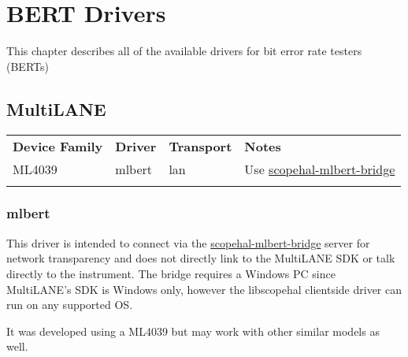 \chapter{BERT Drivers}
\label{sec:bert-drivers}

This chapter describes all of the available drivers for bit error rate testers (BERTs)

\section{MultiLANE}

\begin{tabularx}{16cm}{lllX}
\thickhline
\textbf{Device Family} & \textbf{Driver} & \textbf{Transport} & \textbf{Notes} \\
\thickhline
ML4039 & mlbert & lan & Use \href{https://github.com/ngscopeclient/scopehal-mlbert-bridge}{scopehal-mlbert-bridge} \\
\thickhline
\end{tabularx}

\subsection{mlbert}

This driver is intended to connect via the
\href{https://github.com/ngscopeclient/scopehal-mlbert-bridge}{scopehal-mlbert-bridge} server for network transparency
and does not directly link to the MultiLANE SDK or talk directly to the instrument. The bridge requires a Windows PC
since MultiLANE's SDK is Windows only, however the libscopehal clientside driver can run on any supported OS.

It was developed using a ML4039 but may work with other similar models as well.
